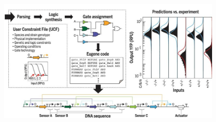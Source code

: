 \documentclass[11pt]{article}
\begin{document}
\begin{figure}[ht!]
\centering
\includegraphics[width=18cm,height=13cm,keepaspectratio]{discussion2.jpg}
\label{d_output}
\end{figure}




 
\end{document}
